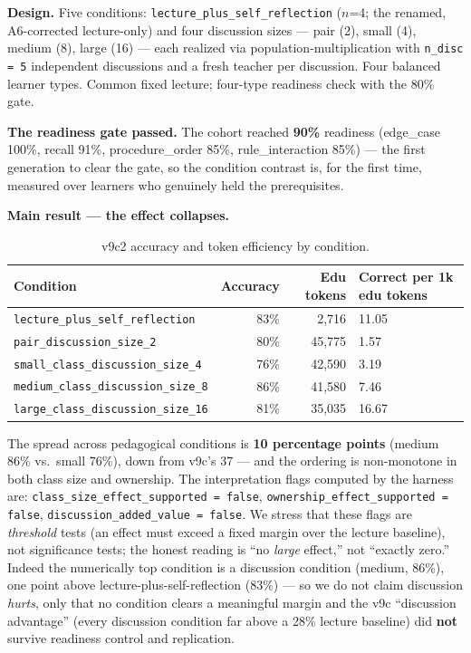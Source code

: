 \documentclass[11pt]{article}
\begin{document}
\textbf{Design.}  Five conditions: \texttt{lecture\_plus\_self\_reflection} ($n$=4;
the renamed, A6-corrected lecture-only) and four discussion sizes --- pair (2), small
(4), medium (8), large (16) --- each realized via population-multiplication with
\texttt{n\_disc = 5} independent discussions and a fresh teacher per discussion.
Four balanced learner types.  Common fixed lecture; four-type readiness check with
the 80\% gate.

\textbf{The readiness gate passed.}  The cohort reached \textbf{90\%} readiness
(edge\_case 100\%, recall 91\%, procedure\_order 85\%, rule\_interaction 85\%) --- the
first generation to clear the gate, so the condition contrast is, for the first time,
measured over learners who genuinely held the prerequisites.

\textbf{Main result --- the effect collapses.}

\begin{table}[h]
\centering
\caption{v9c2 accuracy and token efficiency by condition.}
\label{tab:v9c2-main}
\begin{tabular}{@{}lrrl@{}}
\toprule
Condition & Accuracy & Edu tokens & Correct per 1k edu tokens \\
\midrule
\texttt{lecture\_plus\_self\_reflection} & 83\% &  2,716 & 11.05 \\
\texttt{pair\_discussion\_size\_2}        & 80\% & 45,775 &  1.57 \\
\texttt{small\_class\_discussion\_size\_4} & 76\% & 42,590 &  3.19 \\
\texttt{medium\_class\_discussion\_size\_8} & 86\% & 41,580 &  7.46 \\
\texttt{large\_class\_discussion\_size\_16} & 81\% & 35,035 & 16.67 \\
\bottomrule
\end{tabular}
\end{table}

The spread across pedagogical conditions is \textbf{10 percentage points} (medium
86\% vs.\ small 76\%), down from v9c's 37 --- and the ordering is non-monotone in
both class size and ownership.  The interpretation flags computed by the harness are:
\texttt{class\_size\_effect\_supported = false}, \texttt{ownership\_effect\_supported
= false}, \texttt{discussion\_added\_value = false}.  We stress that these flags are
\emph{threshold} tests (an effect must exceed a fixed margin over the lecture
baseline), not significance tests; the honest reading is ``no \emph{large} effect,''
not ``exactly zero.''  Indeed the numerically top condition is a discussion condition
(medium, 86\%), one point above lecture-plus-self-reflection (83\%) --- so we do not
claim discussion \emph{hurts}, only that no condition clears a meaningful margin and
the v9c ``discussion advantage'' (every discussion condition far above a 28\% lecture
baseline) did \textbf{not} survive readiness control and replication.
\end{document}
